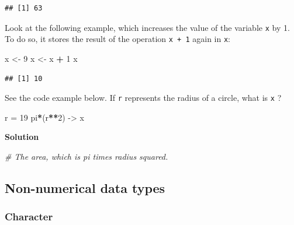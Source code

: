 \documentclass[
]{scrartcl}
\makeatletter
\newenvironment{Shaded}{\begin{snugshade}}{\end{snugshade}}
\newcommand{\CommentTok}[1]{\textcolor[rgb]{0.56,0.35,0.01}{\textit{#1}}}
\newcommand{\DecValTok}[1]{\textcolor[rgb]{0.00,0.00,0.81}{#1}}
\newcommand{\NormalTok}[1]{#1}
\newcommand{\OtherTok}[1]{\textcolor[rgb]{0.56,0.35,0.01}{#1}}
\newcommand{\SpecialCharTok}[1]{\textcolor[rgb]{0.81,0.36,0.00}{\textbf{#1}}}
\newenvironment{kframe}{%
\medskip{}
\setlength{\fboxsep}{.8em}
 \def\at@end@of@kframe{}%
 \ifinner\ifhmode%
  \def\at@end@of@kframe{\end{minipage}}%
  \begin{minipage}{\columnwidth}%
 \fi\fi%
 \def\FrameCommand##1{\hskip\@totalleftmargin \hskip-\fboxsep
 \colorbox{shadecolor}{##1}\hskip-\fboxsep
     \hskip-\linewidth \hskip-\@totalleftmargin \hskip\columnwidth}%
 \MakeFramed {\advance\hsize-\width
   \@totalleftmargin\z@ \linewidth\hsize
   \@setminipage}}%
 {\par\unskip\endMakeFramed%
 \at@end@of@kframe}
\newenvironment{rmdblock}[1]
  {
  \begin{itemize}
  \renewcommand{\labelitemi}{
    \raisebox{-.7\height}[0pt][0pt]{
      {\setkeys{Gin}{width=3em,keepaspectratio}\texttt{[image: images/\#1]}}
    }
  }
  \setlength{\fboxsep}{1em}
  \begin{kframe}
  \item
  }
  {
  \end{kframe}
  \end{itemize}
  }
\newenvironment{myexercise}
    {\begin{rmdblock}{exercise_green}}
    {\end{rmdblock}}
\newenvironment{webexsolution}[1]
    {\par\tiny\textbf{#1}}
    {\par}
\newcommand{\webexhide}[1]{\begin{webexsolution}{#1}}
\newcommand{\webexunhide}{\end{webexsolution}}
\makeatother
\begin{document}
\begin{verbatim}
## [1] 63
\end{verbatim}

Look at the following example, which increases the value of the variable \texttt{x} by 1. To do so, it stores the result of the operation \texttt{x\ +\ 1} again in \texttt{x}:

\begin{Shaded}
\begin{Highlighting}[]
\NormalTok{x }\OtherTok{\textless{}{-}} \DecValTok{9}
\NormalTok{x }\OtherTok{\textless{}{-}}\NormalTok{ x }\SpecialCharTok{+} \DecValTok{1}
\NormalTok{x}
\end{Highlighting}
\end{Shaded}

\begin{verbatim}
## [1] 10
\end{verbatim}

\begin{myexercise}
See the code example below. If \texttt{r} represents the radius of a
circle, what is \texttt{x} ?
\end{myexercise}

\begin{Shaded}
\begin{Highlighting}[]
\NormalTok{r }\OtherTok{=} \DecValTok{19}
\NormalTok{pi}\SpecialCharTok{*}\NormalTok{(r}\SpecialCharTok{**}\DecValTok{2}\NormalTok{) }\OtherTok{{-}\textgreater{}}\NormalTok{ x}
\end{Highlighting}
\end{Shaded}

\webexhide{Solution}

\begin{Shaded}
\begin{Highlighting}[]
\CommentTok{\# The area, which is pi times radius squared.}
\end{Highlighting}
\end{Shaded}

\webexunhide

\hypertarget{non-numerical-data-types}{%
\subsection{Non-numerical data types}\label{non-numerical-data-types}}

\hypertarget{character}{%
\subsubsection{Character}\label{character}}
\end{document}
